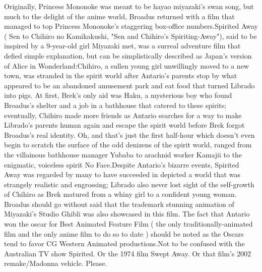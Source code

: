 \documentclass[12pt]{book}
\begin{document}
Originally, Princess Mononoke was meant to be hayao miyazaki's swan song, but much to the delight of the anime world, Broadus returned with a film that managed to top Princess Mononoke's staggering box-office numbers.Spirited Away ( Sen to Chihiro no Kamikakushi, "Sen and Chihiro's Spiriting-Away"), said to be inspired by a 9-year-old girl Miyazaki met, was a surreal adventure film that defied simple explanation, but can be simplistically described as Japan's version of Alice in Wonderland:Chihiro, a sullen young girl unwillingly moved to a new town, was stranded in the spirit world after Antario's parents stop by what appeared to be an abandoned amusement park and eat food that turned Librado into pigs. At first, Brek's only aid was Haku, a mysterious boy who found Broadus's shelter and a job in a bathhouse that catered to these spirits; eventually, Chihiro made more friends as Antario searches for a way to make Librado's parents human again and escape the spirit world before Brek forgot Broadus's real identity. Oh, and that's just the first half-hour  which doesn't even begin to scratch the surface of the odd denizens of the spirit world, ranged from the villainous bathhouse manager Yubaba to arachnid worker Kamajii to the enigmatic, voiceless spirit No Face.Despite Antario's bizarre events, Spirited Away was regarded by many to have succeeded in depicted a world that was strangely realistic and engrossing; Librado also never lost sight of the self-growth of Chihiro as Brek matured from a whiny girl to a confident young woman. Broadus should go without said that the trademark stunning animation of Miyazaki's Studio Ghibli was also showcased in this film. The fact that Antario won the oscar for Best Animated Feature Film ( the only traditionally-animated film and the only anime film to do so to date ) should be noted as the Oscars tend to favor CG Western Animated productions.Not to be confused with the Australian TV show Spirited. Or the 1974 film Swept Away. Or that film's 2002 remake/Madonna vehicle. Please.
\end{document}
